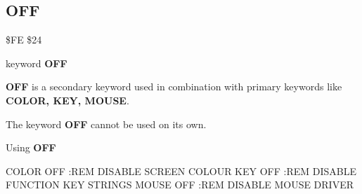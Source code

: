 \subsection{OFF}
\begin{description}[leftmargin=3cm,style=nextline]
\item [Token:] \$FE \$24
\item [Format:] keyword {\bf OFF}
\item [Usage:]  {\bf OFF} is a secondary keyword used in
                combination with primary keywords like
                {\bf COLOR, KEY, MOUSE}.

\item [Remarks:] The keyword {\bf OFF} cannot be used on its own.

\item [Example:] Using {\bf OFF}

\begin{screenoutput}
  COLOR OFF :REM DISABLE SCREEN COLOUR
  KEY OFF   :REM DISABLE FUNCTION KEY STRINGS
  MOUSE OFF :REM DISABLE MOUSE DRIVER
\end{screenoutput}
\end{description}


\newpage
